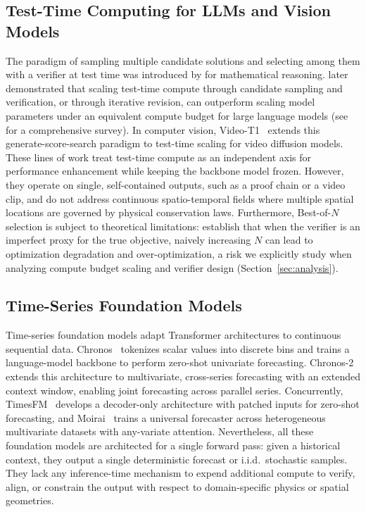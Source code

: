 \documentclass[preprint,12pt]{elsarticle}
\begin{document}
\subsection{Test-Time Computing for LLMs and Vision Models}
The paradigm of sampling multiple candidate solutions and selecting among them with a verifier at test time was introduced by \citep{cobbe2021verifiers} for mathematical reasoning. \citep{snell2024scaling} later demonstrated that scaling test-time compute through candidate sampling and verification, or through iterative revision, can outperform scaling model parameters under an equivalent compute budget for large language models (see \citep{ji2025survey} for a comprehensive survey). In computer vision, Video-T1~\citep{liu2025videot1} extends this generate-score-search paradigm to test-time scaling for video diffusion models. These lines of work treat test-time compute as an independent axis for performance enhancement while keeping the backbone model frozen. However, they operate on single, self-contained outputs, such as a proof chain or a video clip, and do not address continuous spatio-temporal fields where multiple spatial locations are governed by physical conservation laws. Furthermore, Best-of-$N$ selection is subject to theoretical limitations: \citep{huang2025bestofn} establish that when the verifier is an imperfect proxy for the true objective, naively increasing $N$ can lead to optimization degradation and over-optimization, a risk we explicitly study when analyzing compute budget scaling and verifier design (Section~\ref{sec:analysis}).

\subsection{Time-Series Foundation Models}
Time-series foundation models adapt Transformer architectures to continuous sequential data. Chronos~\citep{ansari2024chronos} tokenizes scalar values into discrete bins and trains a language-model backbone to perform zero-shot univariate forecasting. Chronos-2~\citep{ansari2025chronos2} extends this architecture to multivariate, cross-series forecasting with an extended context window, enabling joint forecasting across parallel series. Concurrently, TimesFM~\citep{das2024timesfm} develops a decoder-only architecture with patched inputs for zero-shot forecasting, and Moirai~\citep{woo2024moirai} trains a universal forecaster across heterogeneous multivariate datasets with any-variate attention. Nevertheless, all these foundation models are architected for a single forward pass: given a historical context, they output a single deterministic forecast or i.i.d.\ stochastic samples. They lack any inference-time mechanism to expend additional compute to verify, align, or constrain the output with respect to domain-specific physics or spatial geometries.
\end{document}
